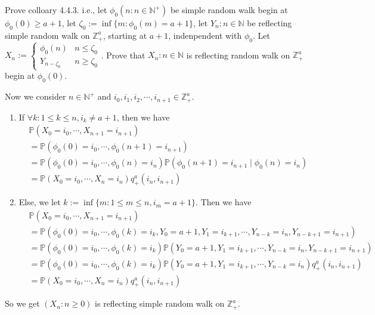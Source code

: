 \documentclass[../main]{subfiles}
\begin{document}
\begin{problem}\label{pro:4}
  Prove colloary 4.4.3. i.e., let \(\phi_0(n:n \in \mathbb{N}^+)\) be simple random walk begin at \(\phi_0(0) \geq a+1\),
  let \(\zeta_0:=\inf \{m:\phi_0(m)=a+1\}\), let \(Y_n:n \in \mathbb{N}\) be reflecting simple random walk on \(\mathbb{Z}^a_+\), starting at \(a+1\), indenpendent with \(\phi_0\).
  Let \(X_n:=\begin{cases}
    \phi_0(n)     & n \leq \zeta_0 \\
    Y_{n-\zeta_0} & n \geq \zeta_0
  \end{cases}\).
  Prove that \(X_n:n \in \mathbb{N}\) is reflecting random walk on \(\mathbb{Z}^a_+\) begin at \(\phi_0(0)\).
\end{problem}
\begin{solution}
  Now we consider \(n \in \mathbb{N}^+\) and \(i_0,i_1,i_2,\cdots,i_{n+1}  \in \mathbb{Z}^a_+\).
  \begin{enumerate}
    \item If \(\forall k:1 \leq k \leq n,i_k \neq a+1\), then we have
      \[
        \begin{aligned}
           & \mathbb{P}(X_0=i_0,\cdots,X_{n+1} =i_{n+1} )                                                      \\
           & =\mathbb{P}(\phi_0(0)=i_0,\cdots,\phi_0(n+1)=i_{n+1} )                                            \\
           & =\mathbb{P}(\phi_0(0)=i_0,\cdots,\phi_0(n)=i_n)\mathbb{P}(\phi_0(n+1)=i_{n+1} \mid \phi_0(n)=i_n) \\
           & =\mathbb{P}(X_0=i_0,\cdots,X_n=i_n)q^a_+(i_n,i_{n+1})
        \end{aligned}
      \]
    \item Else, we let \(k:=\inf \{m:1 \leq m \leq n,i_m=a+1\}\).
      Then we have
      \[
        \begin{aligned}
           & \mathbb{P}(X_0=i_0,\cdots,X_{n+1}=i_{n+1})                                                                              \\
           & =\mathbb{P}(\phi_0(0)=i_0,\cdots,\phi_0(k)=i_k,Y_0=a+1,Y_1=i_{k+1},\cdots,Y_{n-k}=i_{n},Y_{n-k+1}=i_{n+1})              \\
           & =\mathbb{P}(\phi_0(0)=i_0,\cdots,\phi_0(k)=i_k)\mathbb{P}(Y_0=a+1,Y_1=i_{k+1},\cdots,Y_{n-k}=i_{n},Y_{n-k+1}=i_{n+1})   \\
           & =\mathbb{P}(\phi_0(0)=i_0,\cdots,\phi_0(k)=i_k)\mathbb{P}(Y_0=a+1,Y_1=i_{k+1},\cdots,Y_{n-k}=i_{n}) q^a_+(i_n,i_{n+1} ) \\
           & =\mathbb{P}(X_0=i_0,\cdots,X_n=i_n)q^a_+(i_n,i_{n+1})
        \end{aligned}
      \]
  \end{enumerate}
  So we get \((X_n:n \geq 0)\) is reflecting simple random walk on \(\mathbb{Z}^a_+\).
\end{solution}
\end{document}
